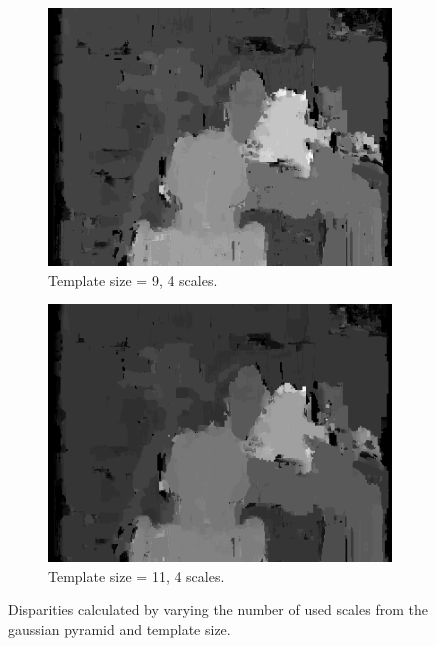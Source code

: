 \documentclass[12pt,a4paper,oneside,final]{article}
\begin{document}
\begin{table}[H]
\begin{subtable}{1\textwidth}
\begin{figure}[H]
\begin{subfigure}[b]{0.24\textwidth}
			\includegraphics[width=\textwidth]{disparity_s4_k9set_1.png}
			\caption{Template size = 9, 4 scales.}
		\end{subfigure}
		\begin{subfigure}[b]{0.24\textwidth}
			\includegraphics[width=\textwidth]{disparity_s4_k11set_1.png}
			\caption{Template size = 11, 4 scales.}
		\end{subfigure}
		\caption{Disparities calculated by varying the number of used scales from the gaussian pyramid and template size.}
		\label{fig:disparities}
	\end{figure}
	

\end{subtable}
\end{table}
\end{document}
